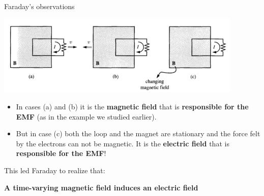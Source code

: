 \begin{frame}{Faraday's observations}

\begin{center}
  \includegraphics[width=0.88\textwidth]{./images/schematics/faraday_law_schematic.png}\\
\end{center}

\begin{itemize}
   \item In cases (a) and (b) it is the {\bf magnetic field} that is {\bf responsible for the EMF}
             (as in the example we studied earlier).
    \item But in case (c) both the loop and the magnet are stationary and the force felt
              by the electrons can not be magnetic.
              It is the {\bf electric field} that is {\bf responsible for the EMF}!
\end{itemize}

This led Faraday to realize that:
\begin{center}
{\bf A time-varying magnetic field induces an electric field}
\end{center}

\end{frame}

%
%
%

